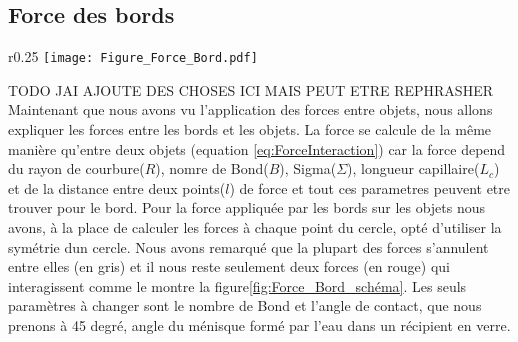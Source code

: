         \subsection{Force des bords}
            \begin{wrapfigure}{r}{0.25\textwidth}
            \centering
                \texttt{[image: Figure\_Force\_Bord.pdf]}
                \caption{Schéma des forces des bords.}
                \label{fig:Force_Bord_schéma}
            \end{wrapfigure}
            TODO JAI AJOUTE DES CHOSES ICI MAIS PEUT ETRE REPHRASHER
            Maintenant que nous avons vu l'application des forces entre objets, nous allons expliquer les forces entre les bords et les objets. La force se calcule de la même manière qu'entre deux objets (equation \ref{eq:ForceInteraction}) car la force depend du rayon de courbure($R$), nomre de Bond($B$), Sigma($\Sigma$), longueur capillaire($L_c$) et de la distance entre deux points($l$) de force et tout ces parametres peuvent etre trouver pour le bord. Pour la force appliquée par les bords sur les objets nous avons, à la place de calculer les forces à chaque point du cercle, opté d'utiliser la symétrie dun cercle. Nous avons remarqué que la plupart des forces s'annulent entre elles (en gris) et il nous reste seulement deux forces (en rouge) qui interagissent comme le montre la figure\ref{fig:Force_Bord_schéma}. Les seuls paramètres à changer sont le nombre de Bond et l'angle de contact, que nous prenons à 45 degré, angle du ménisque formé par l'eau dans un récipient en verre. 
